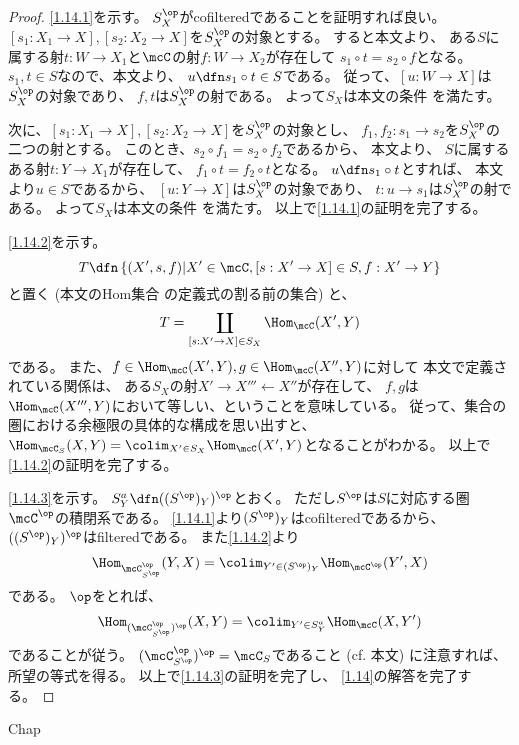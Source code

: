 \documentclass[uplatex,dvipdfmx]{jsarticle}
\begin{document}
\begin{proof}
  \ref{1.14.1}を示す。
  \(S_X^{\op}\)がcofilteredであることを証明すれば良い。
  \([s_1:X_1\to X], [s_2:X_2\to X]\)を\(S_X^{\op}\)の対象とする。
  すると本文\cite[Definition 1.6.1 (S3)]{kashiwara2002sheaves}より、
  ある\(S\)に属する射\(t:W\to X_1\)と\(\mcC\)の射\(f:W\to X_2\)が存在して
  \(s_1\circ t = s_2\circ f\)となる。
  \(s_1,t\in S\)なので、本文\cite[Definition 1.6.1 (S2)]{kashiwara2002sheaves}より、
  \(u\dfn s_1\circ t\in S\)である。
  従って、\([u:W\to X]\)は\(S_X^{\op}\)の対象であり、
  \(f,t\)は\(S_X^{\op}\)の射である。
  よって\(S_X\)は本文の条件
  \cite[Definition 1.11.2 (1.11.1)]{kashiwara2002sheaves}を満たす。

  次に、\([s_1:X_1\to X], [s_2:X_2\to X]\)を\(S_X^{\op}\)の対象とし、
  \(f_1,f_2:s_1\to s_2\)を\(S_X^{\op}\)の二つの射とする。
  このとき、\(s_2\circ f_1 = s_2\circ f_2\)であるから、
  本文\cite[Definition 1.6.1 (S4)]{kashiwara2002sheaves}より、
  \(S\)に属するある射\(t:Y\to X_1\)が存在して、
  \(f_1\circ t = f_2\circ t\)となる。
  \(u\dfn s_1\circ t\)とすれば、
  本文\cite[Definition 1.6.1 (S2)]{kashiwara2002sheaves}より\(u\in S\)であるから、
  \([u:Y\to X]\)は\(S_X^{\op}\)の対象であり、
  \(t:u\to s_1\)は\(S_X^{\op}\)の射である。
  よって\(S_X\)は本文の条件
  \cite[Definition 1.11.2 (1.11.2)]{kashiwara2002sheaves}を満たす。
  以上で\ref{1.14.1}の証明を完了する。

  \ref{1.14.2}を示す。
  \[
  T \dfn \left\{ (X',s,f) \middle| X'\in \mcC, [s:X'\to X]\in S, f:X'\to Y\right\}
  \]
  と置く (本文\cite[Definition 1.6.2 (S3)]{kashiwara2002sheaves}のHom集合
  の定義式の割る前の集合) と、
  \[T = \coprod_{[s:X'\to X]\in S_X}\Hom_{\mcC}(X',Y)\]
  である。
  また、\(f\in \Hom_{\mcC}(X',Y), g\in \Hom_{\mcC}(X'',Y)\)に対して
  本文\cite[Definition 1.6.2]{kashiwara2002sheaves}で定義されている関係は、
  ある\(S_X\)の射\(X'\to X'''\gets X''\)が存在して、
  \(f,g\)は\(\Hom_{\mcC}(X''',Y)\)において等しい、ということを意味している。
  従って、集合の圏における余極限の具体的な構成を思い出すと、
  \(\Hom_{\mcC_S}(X,Y) = \colim_{X'\in S_X}\Hom_{\mcC}(X',Y)\)となることがわかる。
  以上で\ref{1.14.2}の証明を完了する。

  \ref{1.14.3}を示す。
  \(S_Y^a\dfn ((S^{\op})_Y)^{\op}\)とおく。
  ただし\(S^{\op}\)は\(S\)に対応する圏\(\mcC^{\op}\)の積閉系である。
  \ref{1.14.1}より\((S^{\op})_Y\)はcofilteredであるから、
  \(((S^{\op})_Y)^{\op}\)はfilteredである。
  また\ref{1.14.2}より
  \[\Hom_{\mcC^{\op}_{S^{\op}}}(Y,X) =
  \colim_{Y'\in (S^{\op})_Y}\Hom_{\mcC^{\op}}(Y',X)\]
  である。
  \(\op\)をとれば、
  \[\Hom_{(\mcC^{\op}_{S^{\op}})^{\op}}(X,Y) =
  \colim_{Y'\in S_Y^a}\Hom_{\mcC}(X,Y')\]
  であることが従う。
  \((\mcC^{\op}_{S^{\op}})^{\op} = \mcC_S\)であること
  (cf. 本文\cite[Remark 1.6.4]{kashiwara2002sheaves})
  に注意すれば、所望の等式を得る。
  以上で\ref{1.14.3}の証明を完了し、
  \autoref{1.14}の解答を完了する。
\end{proof}





\ifcsname Chap\endcsname\else
\printbibliography
\end{document}
